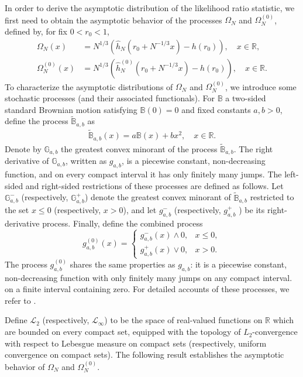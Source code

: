 \documentclass[12pt]{amsart}
\theoremstyle{plain}
\theoremstyle{remark}
\numberwithin{equation}{section}
\begin{document}
In order to derive the asymptotic distribution of the likelihood ratio statistic, we first need to obtain the asymptotic behavior of the processes $\Omega_N$ and $\Omega^{(0)}_N$, defined by, for fix $0 < r_0 < 1$, 
\begin{align}\label{eq:omega}
    \Omega_N(x) &= N^{1/3}\left(\hat{h}_N\left(r_0 + N^{-1/3}x\right) - h(r_0)\right), \quad x \in \mathbb{R}, \nonumber \\ 
    \Omega^{(0)}_N(x) &= N^{1/3}\left(\hat{h}^{(0)}_N\left(r_0 + N^{-1/3}x\right) - h(r_0)\right), \quad x \in \mathbb{R}.
\end{align}
To characterize the asymptotic distributions of $\Omega_N$ and $\Omega^{(0)}_N$, we introduce some stochastic processes (and their associated functionals).
For $\mathbb{B}$ a two-sided standard Brownian motion satisfying $\mathbb{B}(0) = 0$ and fixed constants $a,b > 0$, define the process $\widetilde{\mathbb{B}}_{a, b}$ as 
\begin{align}\label{eq:bm}\widetilde{\mathbb{B}}_{a,b}(x) = a \mathbb{B}(x) + b x^{2}, \quad x \in \mathbb{R}.\end{align}
Denote by \(\mathbb{G}_{a,b}\) the greatest convex minorant of the process 
\(\widetilde{\mathbb{B}}_{a,b}\). The right derivative of \(\mathbb{G}_{a,b}\), written as \(g_{a,b}\), is a piecewise constant, non-decreasing function, and on every compact interval 
it has only finitely many jumps. The left-sided and right-sided restrictions of these processes are defined as follows. 
Let \(\mathbb{G}^{-}_{a,b}\) (respectively, \(\mathbb{G}^{+}_{a,b}\)) denote the greatest convex minorant of \(\widetilde{\mathbb{B}}_{a,b}\) restricted to the set \(x \leq 0\) (respectively, \(x > 0\)), and let \({g}^{-}_{a,b}\) (respectively, \(g^{+}_{a,b}\) ) be its right-derivative process.  
Finally, define the combined process 
\[
g_{a,b}^{(0)}(x) = 
\begin{cases}
g^{-}_{a,b}(x) \wedge 0, & x \leq 0, \\
g^{+}_{a,b}(x) \vee 0, & x > 0.
\end{cases}
\]
The process \(g^{(0)}_{a,b}\) shares the same properties as 
\(g_{a,b}\): it is a piecewise constant, non-decreasing function with only finitely 
many jumps on any compact interval. 
on a finite interval containing zero. 
For detailed accounts of these processes, we refer to \cite{banerjee2001likelihood}. 

Define $\mathcal{L}_2$ (respectively, $\mathcal{L}_{\infty}$) to be the space of real-valued functions on $\mathbb{R}$ which are bounded on every compact set, equipped with the topology of $L_2$-convergence with respect to Lebesgue measure on compact sets (respectively, uniform convergence on compact sets). The following result establishes the asymptotic behavior of $\Omega_N$ and $\Omega^{(0)}_N$.
\end{document}
